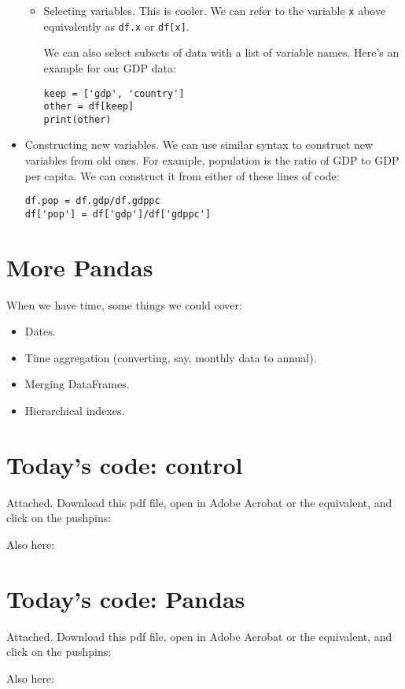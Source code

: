 \documentclass[11pt]{article}
\begin{document}
\begin{itemize}
\begin{itemize}
\item Selecting variables.  This is cooler.
We can refer to the variable {\tt x} above equivalently as
{\tt df.x} or {\tt df[x]}.

We can also select subsets of data with a list of variable names.
Here's an example for our GDP data:
\begin{verbatim}
keep = ['gdp', 'country']
other = df[keep]
print(other)
\end{verbatim}
\end{itemize}

\item Constructing new variables.
We can use similar syntax to construct new variables from old ones.
For example, population is the ratio of GDP to GDP per capita.
We can construct it from either of these lines of code:
\begin{verbatim}
df.pop = df.gdp/df.gdppc
df['pop'] = df['gdp']/df['gdppc']
\end{verbatim}


\end{itemize}


\section{More Pandas}


When we have time, some things we could cover:
\begin{itemize}
\item Dates.
\item Time aggregation (converting, say, monthly data to annual).

\item Merging DataFrames.

\item Hierarchical indexes.

\end{itemize}




\section*{Today's code:  control}

Attached.  Download this pdf file, open in Adobe Acrobat or the equivalent,
and click on the pushpins:

Also here:
{\small

}

\section*{Today's code:  Pandas}

Attached.  Download this pdf file, open in Adobe Acrobat or the equivalent,
and click on the pushpins:

Also here:
{\small

}
\end{document}
